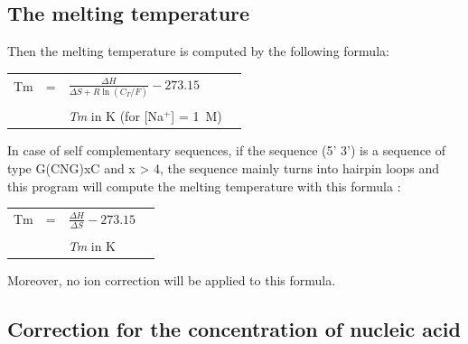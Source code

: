 \documentclass{article}
\begin{document}
\subsection{The melting temperature }  

Then the melting temperature is computed by the following formula: 
 
 

\begin{tabular}[h]{rcp{1.6in}p{2.2in}}
Tm & = & \begin{math} \frac{\Delta{}H}{\Delta{}S + R \ln (C_T/F)} - 273.15 \end{math} \\
   &   &                                                                                                                                                \\
   &   & \footnotesize \textit{Tm} in K (for [Na$^+$] = 1~M)
\end{tabular}



In case of self complementary sequences, if the sequence (5' 3') is a sequence of type G(CNG)xC 
and x > 4, the sequence mainly turns into hairpin loops and this program will compute the melting
temperature with this formula :


   
\begin{tabular}[h]{rcp{1.6in}p{2.2in}}
Tm & = & \begin{math} \frac{\Delta{}H}{\Delta{}S} - 273.15 \end{math} \\
   &   &                                                                                                                                                \\
   &   & \footnotesize \textit{Tm} in K 
\end{tabular}


Moreover, no ion correction will be applied to this formula.

\subsection{Correction for the concentration of nucleic acid }  
\end{document}
